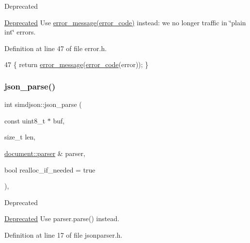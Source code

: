 \begin{DoxyRefDesc}{Deprecated}
\item[\hyperlink{deprecated__deprecated000011}{Deprecated}]Use {\ttfamily \hyperlink{namespacesimdjson_a4872e460818b01f93d883d184cd0009e}{error\+\_\+message(error\+\_\+code)}} instead\+: we no longer traffic in \char`\"{}plain int\char`\"{} errors.\end{DoxyRefDesc}


Definition at line 47 of file error.\+h.


\begin{DoxyCode}
47 \{ \textcolor{keywordflow}{return} \hyperlink{namespacesimdjson_a4872e460818b01f93d883d184cd0009e}{error\_message}(\hyperlink{namespacesimdjson_a7b735a3a50ba79e3f7f14df5f77d8da9}{error\_code}(error)); \}
\end{DoxyCode}
\mbox{\label{namespacesimdjson_abda111a8c160cd422c8e5e6d2542f1eb}} 
\subsubsection{\texorpdfstring{json\+\_\+parse()}{json\_parse()}\hspace{0.1cm}{\footnotesize\ttfamily [1/4]}}
{\footnotesize\ttfamily int simdjson\+::json\+\_\+parse (\begin{DoxyParamCaption}\item[{const uint8\+\_\+t $\ast$}]{buf,  }\item[{size\+\_\+t}]{len,  }\item[{\hyperlink{classsimdjson_1_1document_1_1parser}{document\+::parser} \&}]{parser,  }\item[{bool}]{realloc\+\_\+if\+\_\+needed = {\ttfamily true} }\end{DoxyParamCaption})\hspace{0.3cm}{\ttfamily [inline]}, {\ttfamily [noexcept]}}

\begin{DoxyRefDesc}{Deprecated}
\item[\hyperlink{deprecated__deprecated000012}{Deprecated}]Use {\ttfamily parser.\+parse()} instead.\end{DoxyRefDesc}


Definition at line 17 of file jsonparser.\+h.


